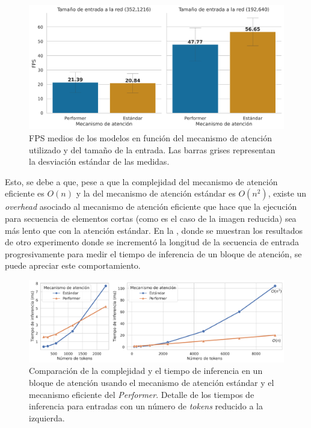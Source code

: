 \begin{figure}[H]
\centering
\includegraphics[width=0.9\linewidth]{imagenes/Resultados/velocidad_inferencia_mecanismo_atencion.png} 
\captionsetup{width=.9\linewidth}
\caption{FPS medios de los modelos en función del mecanismo de atención utilizado y del tamaño de la entrada. Las barras grises representan la desviación estándar de las medidas.}
\label{fig:resultados-inf-mec-atention}
\end{figure}

Esto, se debe a que, pese a que la complejidad del mecanismo de atención eficiente es $O(n)$ y la del mecanismo de atención estándar es $O(n^2)$, existe un \textit{overhead} asociado al mecanismo de atención eficiente que hace que la ejecución para secuencia de elementos cortas (como es el caso de la imagen reducida) sea más lento que con la atención estándar. En la , donde se muestran los resultados de otro experimento donde se incrementó la longitud de la secuencia de entrada progresivamente para medir el tiempo de inferencia de un bloque de atención, se puede apreciar este comportamiento.

\begin{figure}[H]
\centering
\includegraphics[width=\linewidth]{imagenes/Resultados/complejidad_mecanismo_atencion.png} 
\captionsetup{width=.95\linewidth}
\caption{Comparación de la complejidad y el tiempo de inferencia en un bloque de atención usando el mecanismo de atención estándar y el mecanismo eficiente del \textit{Performer}. Detalle de los tiempos de inferencia para entradas con un número de \textit{tokens} reducido a la izquierda.}
\label{fig:resultados-complejidad-mec-atencion}
\end{figure}


















